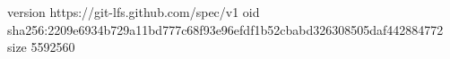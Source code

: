 version https://git-lfs.github.com/spec/v1
oid sha256:2209e6934b729a11bd777c68f93e96efdf1b52cbabd326308505daf442884772
size 5592560
